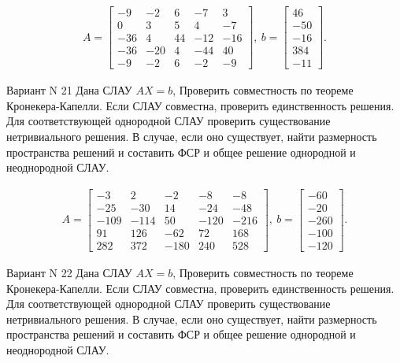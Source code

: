\documentclass[11pt]{report}
\begin{document}
\begin{align*}
 A = \left[\begin{matrix}-9 & -2 & 6 & -7 & 3\\0 & 3 & 5 & 4 & -7\\-36 & 4 & 44 & -12 & -16\\-36 & -20 & 4 & -44 & 40\\-9 & -2 & 6 & -2 & -9\end{matrix}\right],
\ b = \left[\begin{matrix}46\\-50\\-16\\384\\-11\end{matrix}\right]. 
 \end{align*}

Вариант N 21
Дана СЛАУ $AX = b$,
Проверить совместность по теореме Кронекера-Капелли. Если СЛАУ совместна, проверить единственность решения.
Для соответствующей однородной СЛАУ проверить существование нетривиального решения. В случае, если оно существует,
найти размерность пространства решений и составить ФСР и общее решение однородной  и неоднородной СЛАУ.


\begin{align*}
 A = \left[\begin{matrix}-3 & 2 & -2 & -8 & -8\\-25 & -30 & 14 & -24 & -48\\-109 & -114 & 50 & -120 & -216\\91 & 126 & -62 & 72 & 168\\282 & 372 & -180 & 240 & 528\end{matrix}\right],
\ b = \left[\begin{matrix}-60\\-20\\-260\\-100\\-120\end{matrix}\right]. 
 \end{align*}

Вариант N 22
Дана СЛАУ $AX = b$,
Проверить совместность по теореме Кронекера-Капелли. Если СЛАУ совместна, проверить единственность решения.
Для соответствующей однородной СЛАУ проверить существование нетривиального решения. В случае, если оно существует,
найти размерность пространства решений и составить ФСР и общее решение однородной  и неоднородной СЛАУ.
\end{document}
